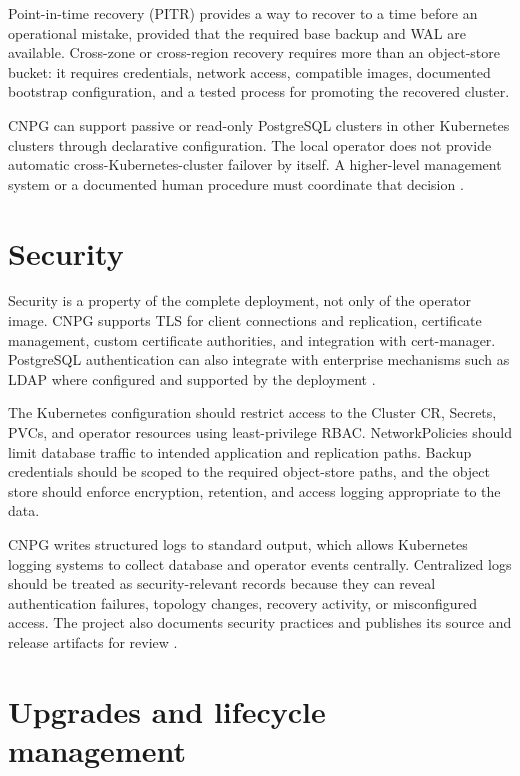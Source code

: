 \documentclass[11pt,a4paper]{article}
\begin{document}
Point-in-time recovery (PITR) provides a way to recover to a time before an operational mistake, provided that the required base backup and WAL are available. Cross-zone or cross-region recovery requires more than an object-store bucket: it requires credentials, network access, compatible images, documented bootstrap configuration, and a tested process for promoting the recovered cluster.

CNPG can support passive or read-only PostgreSQL clusters in other Kubernetes clusters through declarative configuration. The local operator does not provide automatic cross-Kubernetes-cluster failover by itself. A higher-level management system or a documented human procedure must coordinate that decision \cite{cnpg-architecture}.

\section{Security}

Security is a property of the complete deployment, not only of the operator image. CNPG supports TLS for client connections and replication, certificate management, custom certificate authorities, and integration with cert-manager. PostgreSQL authentication can also integrate with enterprise mechanisms such as LDAP where configured and supported by the deployment \cite{cnpg-tls,cnpg-auth}.

The Kubernetes configuration should restrict access to the Cluster CR, Secrets, PVCs, and operator resources using least-privilege RBAC. NetworkPolicies should limit database traffic to intended application and replication paths. Backup credentials should be scoped to the required object-store paths, and the object store should enforce encryption, retention, and access logging appropriate to the data.

CNPG writes structured logs to standard output, which allows Kubernetes logging systems to collect database and operator events centrally. Centralized logs should be treated as security-relevant records because they can reveal authentication failures, topology changes, recovery activity, or misconfigured access. The project also documents security practices and publishes its source and release artifacts for review \cite{cnpg-security}.

\section{Upgrades and lifecycle management}
\end{document}
